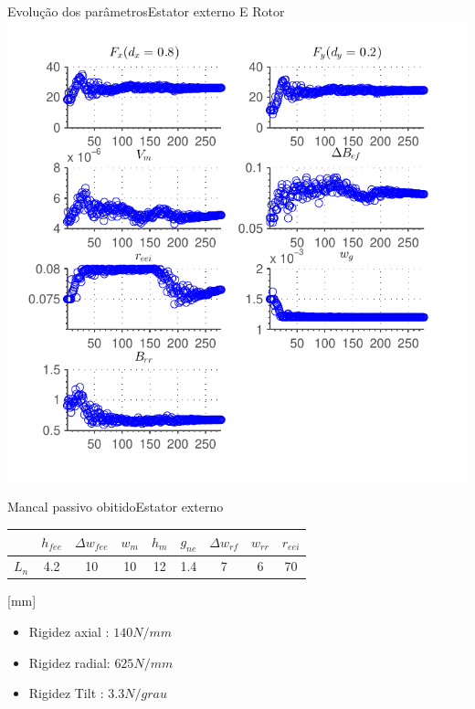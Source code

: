 \documentclass{beamer}
\begin{document}
\begin{frame}{Evolução dos parâmetros}{Estator externo E Rotor}
\centering
	\includegraphics[width=0.8\linewidth]{Simulacoes/Passivo2/otimizacao_passivo_parametros.pdf}
\end{frame}

\begin{frame}{Mancal passivo obitido}{Estator externo}
\centering

	\begin{tabular}{c c c c c c c c c}
		& $h_{fee}$ &$\Delta w_{fee}$ & $w_m$ & $h_m$  & $g_{ne}$ & $\Delta w_{rf}$ & $w_{rr}$ & $r_{eei}$ \\ \hline \hline
		$L_{n}$  	&  4.2 &   10 &   10 &    12 &   1.4 &  7 &   6 &    70 \\
	\end{tabular} 
	
\hfill [mm]
\vspace{8px}
	
\begin{itemize}
	\item Rigidez axial : $140N/mm$
	\item Rigidez radial: $625N/mm$ 
	\item Rigidez Tilt  : $3.3N/grau$
\end{itemize}
	
\end{frame}
\end{document}
